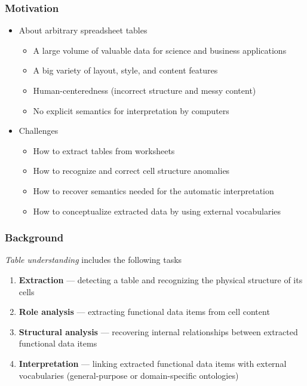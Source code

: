 \documentclass[10pt]{beamer}
\begin{document}
\begin{frame}
\frametitle{Motivation}
\begin{itemize}
\item About arbitrary spreadsheet tables
\begin{itemize}
	\item A large volume of valuable data for science and business applications
	\item A big variety of layout, style, and content features
	\item Human-centeredness (incorrect structure and messy content)
	\item No explicit semantics for interpretation by computers
\end{itemize}
\bigskip
\item Challenges
\begin{itemize}
	\item How to extract tables from worksheets
	\item How to recognize and correct cell structure anomalies
	\item How to recover semantics needed for the automatic interpretation
	\item How to conceptualize extracted data by using external vocabularies
\end{itemize}
\end{itemize}
\end{frame}

\begin{frame}
\frametitle{Background}
\emph{Table understanding} includes the following tasks
\bigskip
\begin{enumerate}
	\item \textbf{Extraction} --- detecting a table and recognizing the physical structure of its cells
	\item \textbf{Role analysis} --- extracting functional data items from cell content
	\item \textbf{Structural analysis} --- recovering internal relationships between extracted functional data items
	\item \textbf{Interpretation} --- linking extracted functional data items with external vocabularies (general-purpose or domain-specific ontologies)
\end{enumerate}
\end{frame}
\end{document}
